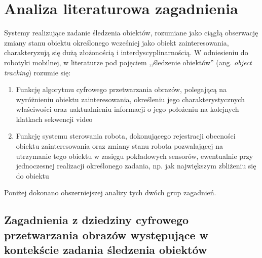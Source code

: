 \chapter{Analiza literaturowa zagadnienia}
\label{cha:Analiza_literaturowa_zagadnienia}
Systemy realizujące zadanie śledzenia obiektów, rozumiane jako ciągłą obserwację zmiany stanu obiektu określonego wcześniej jako obiekt zainteresowania, charakteryzują się dużą złożonością i interdyscyplinarnością. W odniesieniu do robotyki mobilnej, w literaturze pod pojęciem ,,śledzenie obiektów'' (ang. \textit{object tracking}) rozumie się:

\begin{enumerate}

	\item \label{itm:Algorytm_przetwarzania_obrazow} Funkcję algorytmu cyfrowego przetwarzania obrazów, polegającą na wyróżnieniu obiektu zainteresowania, określeniu jego charakterystycznych właściwości oraz uaktualnieniu informacji o jego położeniu na kolejnych klatkach sekwencji video %

	\item \label{itm:System_sterowania} Funkcję systemu sterowania robota, dokonującego rejestracji obecności obiektu zainteresowania oraz zmiany stanu robota pozwalającej na utrzymanie tego obiektu w zasięgu pokładowych sensorów, ewentualnie przy jednoczesnej realizacji określonego zadania, np. jak największym zbliżeniu się do obiektu %
	
\end{enumerate}

Poniżej dokonano obszerniejszej analizy tych dwóch grup zagadnień.


\section{Zagadnienia z dziedziny cyfrowego przetwarzania obrazów występujące w kontekście zadania śledzenia obiektów}
\label{sec:Zagadnienia_z_dziedziny_cyfrowego_przetwarzania_obrazow}

